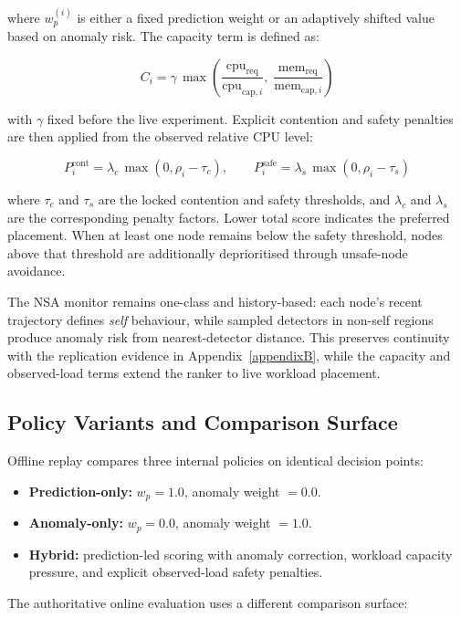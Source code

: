 where \(w_p^{(i)}\) is either a fixed prediction weight or an adaptively shifted value based on anomaly risk. The capacity term is defined as:

\[
C_i = \gamma\,\max\!\left(\frac{\text{cpu}_{\text{req}}}{\text{cpu}_{\text{cap},i}},\;\frac{\text{mem}_{\text{req}}}{\text{mem}_{\text{cap},i}}\right)
\]

with \(\gamma\) fixed before the live experiment. Explicit contention and safety penalties are then applied from the observed relative CPU level:

\[
P_i^{\text{cont}} = \lambda_c\,\max(0, \rho_i - \tau_c), \qquad
P_i^{\text{safe}} = \lambda_s\,\max(0, \rho_i - \tau_s)
\]

where \(\tau_c\) and \(\tau_s\) are the locked contention and safety thresholds, and \(\lambda_c\) and \(\lambda_s\) are the corresponding penalty factors. Lower total score indicates the preferred placement. When at least one node remains below the safety threshold, nodes above that threshold are additionally deprioritised through unsafe-node avoidance.

The NSA monitor remains one-class and history-based: each node's recent trajectory defines \textit{self} behaviour, while sampled detectors in non-self regions produce anomaly risk from nearest-detector distance. This preserves continuity with the replication evidence in Appendix~\ref{appendixB}, while the capacity and observed-load terms extend the ranker to live workload placement.


\subsection{Policy Variants and Comparison Surface}

Offline replay compares three internal policies on identical decision points:

\begin{itemize}
\item \textbf{Prediction-only:} \(w_p=1.0\), anomaly weight \(=0.0\).
\item \textbf{Anomaly-only:} \(w_p=0.0\), anomaly weight \(=1.0\).
\item \textbf{Hybrid:} prediction-led scoring with anomaly correction, workload capacity pressure, and explicit observed-load safety penalties.
\end{itemize}

The authoritative online evaluation uses a different comparison surface:

